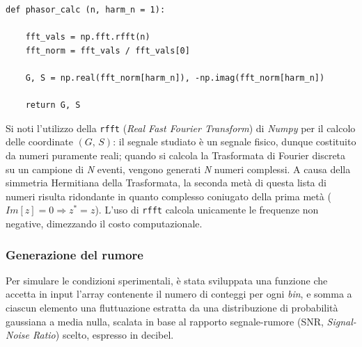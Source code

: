 \begin{verbatim}
def phasor_calc (n, harm_n = 1): 

    fft_vals = np.fft.rfft(n)
    fft_norm = fft_vals / fft_vals[0]
    
    G, S = np.real(fft_norm[harm_n]), -np.imag(fft_norm[harm_n])

    return G, S
\end{verbatim}
Si noti l'utilizzo della \texttt{rfft} (\textit{Real Fast Fourier Transform}) di \textit{Numpy} \cite{harrisArrayProgrammingNumPy2020} per il calcolo delle coordinate $(G,\, S)$: il segnale studiato è un segnale fisico, dunque costituito da numeri puramente reali; quando si calcola la Trasformata di Fourier discreta su un campione di \textit{N} eventi, vengono generati \textit{N} numeri complessi. A causa della simmetria Hermitiana della Trasformata, la seconda metà di questa lista di numeri risulta ridondante in quanto complesso coniugato della prima metà ($\textit{Im}\left[z\right] = 0 \Rightarrow z^* = z$). L'uso di \texttt{rfft} calcola unicamente le frequenze non negative, dimezzando il costo computazionale.



\subsubsection{Generazione del rumore}    %
Per simulare le condizioni sperimentali, è stata sviluppata una funzione che accetta in input l'array contenente il numero di conteggi per ogni \textit{bin}, e somma a ciascun elemento una fluttuazione estratta da una distribuzione di probabilità gaussiana a media nulla, scalata in base al rapporto segnale-rumore (SNR, \textit{Signal-Noise Ratio}) scelto, espresso in decibel. 

